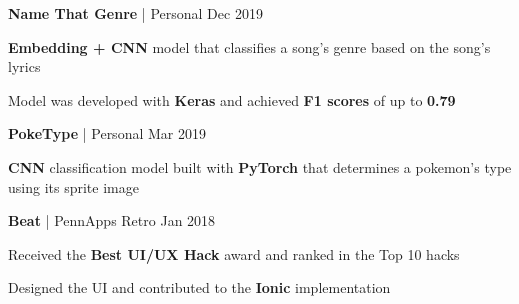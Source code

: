 



\begin{cventries}


\cventry
{\textbf{Name That Genre} | Personal}
{Dec 2019} %
{ %
\begin{cvitems}
\item {\textbf{Embedding + CNN} model that classifies a song's genre based on the song's lyrics}
\item {Model was developed with \textbf{Keras} and achieved \textbf{F1 scores} of up to \textbf{0.79}}
\end{cvitems}
}


\cventry
{\textbf{PokeType} | Personal}
{Mar 2019} %
{ %
\begin{cvitems}
\item {\textbf{CNN} classification model built with \textbf{PyTorch} that determines a pokemon's type using its sprite image}
\end{cvitems}
}


\cventry
{\textbf{Beat} | PennApps Retro}
{Jan 2018} %
{ %
\begin{cvitems}
\item {Received the \textbf{Best UI/UX Hack} award and ranked in the Top 10 hacks}
\item {Designed the UI and contributed to the \textbf{Ionic} implementation}
\end{cvitems}
}


\end{cventries}